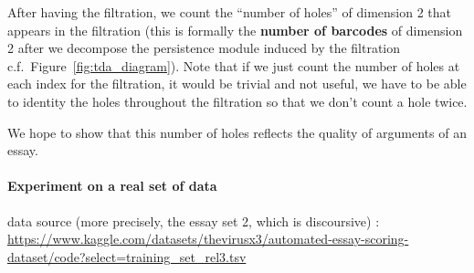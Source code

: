 After having the filtration, we count the ``number of holes'' of dimension 2
that appears in the filtration (this is formally the \textbf{number of
barcodes} of dimension 2 after we decompose the persistence module
induced by the filtration c.f.\ Figure~\ref{fig:tda_diagram}).
Note that if we just count the number of holes at each index for the filtration,
it would be trivial and not useful, we have to be able to identity the holes
throughout the filtration so that we don't count a hole twice.

We hope to show that this number of holes reflects the quality of arguments of an essay.

\paragraph{Experiment on a real set of data}

data source (more precisely, the essay set 2, which is discoursive) :
\url{https://www.kaggle.com/datasets/thevirusx3/automated-essay-scoring-dataset/code?select=training_set_rel3.tsv}

